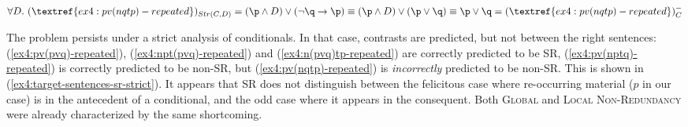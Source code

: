 \begin{exe}
\begin{xlist}
{			$\forall D. \ (\textref{ex4:pv(nqtp)-repeated})_{Str(C, D)} =  (\p \wedge D) \vee (\neg\q \rightarrow \p) \equiv (\p \wedge D) \vee (\p \vee \q) \equiv \p \vee \q = (\textref{ex4:pv(nqtp)-repeated})^-_C$}\label{ex4:pv(nqtp)-repeated-sr}
		\label{ex4:n(pvq)tp-repeated-sr}
	\end{xlist}
\end{exe}

The problem persists under a strict analysis of conditionals. In that case, contrasts are predicted, but not between the right sentences: (\ref{ex4:pv(pvq)-repeated}), (\ref{ex4:npt(pvq)-repeated}) and (\ref{ex4:n(pvq)tp-repeated}) are correctly predicted to be SR, (\ref{ex4:pv(nptq)-repeated}) is correctly predicted to be non-SR, but (\ref{ex4:pv(nqtp)-repeated}) is \textit{incorrectly} predicted to be non-SR. This is shown in (\ref{ex4:target-sentences-sr-strict}). It appears that SR does not distinguish between the felicitous case where re-occurring material ($p$ in our case) is in the antecedent of a conditional, and the odd case where it appears in the consequent. Both \textsc{Global} and \textsc{Local Non-Redundancy} were already characterized by the same shortcoming.

